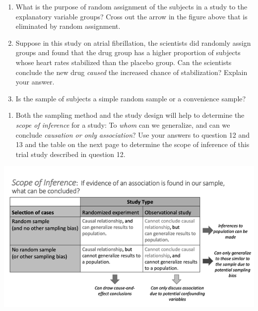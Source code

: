 \documentclass[
]{report}
\providecommand{\tightlist}{%
  \setlength{\itemsep}{0pt}\setlength{\parskip}{0pt}}
\begin{document}
\begin{enumerate}
\def\labelenumi{\arabic{enumi}.}
\setcounter{enumi}{10}
\item
  What is the purpose of random assignment of the subjects in a study to the explanatory variable groups? Cross out the arrow in the figure above that is eliminated by random assignment.
  \vspace{0.8in}
\item
  Suppose in this study on atrial fibrillation, the scientists did randomly assign groups and found that the drug group has a higher proportion of subjects whose heart rates stabilized than the placebo group. Can the scientists conclude the new drug \emph{caused} the increased chance of stabilization? Explain your answer.
  \vspace{0.8in}
\item
  Is the sample of subjects a simple random sample or a convenience sample?
\end{enumerate}

\vspace{0.3in}

\begin{enumerate}
\def\labelenumi{\arabic{enumi}.}
\setcounter{enumi}{13}
\tightlist
\item
  Both the sampling method and the study design will help to determine the \emph{scope of inference} for a study: To \emph{whom} can we generalize, and can we conclude \emph{causation or only association}? Use your answers to question 12 and 13 and the table on the next page to determine the scope of inference of this trial study described in question 12.
  \vspace{0.3in}
\end{enumerate}

\begin{center}\includegraphics[width=0.75\linewidth]{images/ScopeOfInferenceGreyscale} \end{center}
\end{document}

